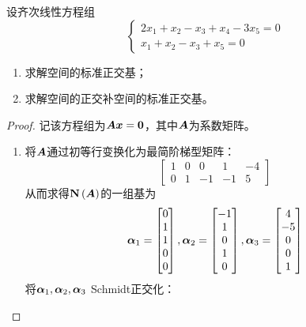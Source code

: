 \begin{problem}
设齐次线性方程组
\begin{equation*}
    \begin{cases}
        2x_1+x_2-x_3+x_4-3x_5=0 \\
        x_1+x_2-x_3+x_5=0
    \end{cases}
\end{equation*}
\begin{enumerate}
    \item 求解空间的标准正交基；
    \item 求解空间的正交补空间的标准正交基。
\end{enumerate}
\end{problem}
\begin{proof}
    记该方程组为\(\boldsymbol{A}\boldsymbol{x}=\boldsymbol{0}\)，其中\(\boldsymbol{A}\)为系数矩阵。
    \begin{enumerate}
        \item {
              将\(\boldsymbol{A}\)通过初等行变换化为最简阶梯型矩阵：
              \begin{equation*}
                  \begin{bmatrix}
                      1 & 0 & 0  & 1  & -4 \\
                      0 & 1 & -1 & -1 & 5
                  \end{bmatrix}
              \end{equation*}
              从而求得\(\boldsymbol{\mathrm{N}}\left( \boldsymbol{A} \right)\)的一组基为
              \begin{equation*}
                  \boldsymbol{\alpha}_1=\begin{bmatrix}0\\1\\1\\0\\0\end{bmatrix},
                  \boldsymbol{\alpha}_2=\begin{bmatrix}-1\\1\\0\\1\\0\end{bmatrix},
                  \boldsymbol{\alpha}_3=\begin{bmatrix}4\\-5\\0\\0\\1\end{bmatrix}
              \end{equation*}
              将\(\boldsymbol{\alpha}_1,\boldsymbol{\alpha}_2,\boldsymbol{\alpha}_3\) Schmidt正交化：
}
\end{enumerate}
\end{proof}
